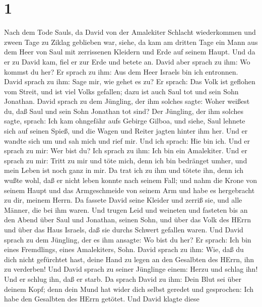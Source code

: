 \hypertarget{section}{%
\section{1}\label{section}}

 Nach dem Tode Sauls, da David von der Amalekiter Schlacht
wiederkommen und zween Tage zu Ziklag geblieben war,  siehe,
da kam am dritten Tage ein Mann aus dem Heer von Saul mit zerrissenen
Kleidern und Erde auf seinem Haupt. Und da er zu David kam, fiel er zur
Erde und betete an.  David aber sprach zu ihm: Wo kommst du
her? Er sprach zu ihm: Aus dem Heer Israels bin ich entronnen.
 David sprach zu ihm: Sage mir, wie gehet es zu? Er sprach:
Das Volk ist geflohen vom Streit, und ist viel Volks gefallen; dazu ist
auch Saul tot und sein Sohn Jonathan.  David sprach zu dem
Jüngling, der ihm solches sagte: Woher weißest du, daß Saul und sein
Sohn Jonathan tot sind?  Der Jüngling, der ihm solches
sagte, sprach: Ich kam ohngefähr aufs Gebirge Gilboa, und siehe, Saul
lehnete sich auf seinen Spieß, und die Wagen und Reiter jagten hinter
ihm her.  Und er wandte sich um und sah mich und rief mir.
Und ich sprach: Hie bin ich.  Und er sprach zu mir: Wer bist
du? Ich sprach zu ihm: Ich bin ein Amalekiter.  Und er
sprach zu mir: Tritt zu mir und töte mich, denn ich bin bedränget umher,
und mein Leben ist noch ganz in mir.  Da trat ich zu ihm
und tötete ihn, denn ich wußte wohl, daß er nicht leben konnte nach
seinem Fall; und nahm die Krone von seinem Haupt und das Armgeschmeide
von seinem Arm und habe es hergebracht zu dir, meinem Herrn.
 Da fassete David seine Kleider und zerriß sie, und alle
Männer, die bei ihm waren.  Und trugen Leid und weineten
und fasteten bis an den Abend über Saul und Jonathan, seinen Sohn, und
über das Volk des HErrn und über das Haus Israels, daß sie durchs
Schwert gefallen waren.  Und David sprach zu dem Jüngling,
der es ihm ansagte: Wo bist du her? Er sprach: Ich bin eines Fremdlings,
eines Amalekiters, Sohn.  David sprach zu ihm: Wie, daß du
dich nicht gefürchtet hast, deine Hand zu legen an den Gesalbten des
HErrn, ihn zu verderben!  Und David sprach zu seiner
Jünglinge einem: Herzu und schlag ihn! Und er schlug ihn, daß er starb.
 Da sprach David zu ihm: Dein Blut sei über deinem Kopf;
denn dein Mund hat wider dich selbst geredet und gesprochen: Ich habe
den Gesalbten des HErrn getötet.  Und David klagte diese
